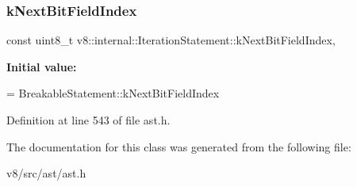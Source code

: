 \subsubsection{\texorpdfstring{k\+Next\+Bit\+Field\+Index}{kNextBitFieldIndex}}
{\footnotesize\ttfamily const uint8\+\_\+t v8\+::internal\+::\+Iteration\+Statement\+::k\+Next\+Bit\+Field\+Index\hspace{0.3cm}{\ttfamily [static]}, {\ttfamily [protected]}}

{\bfseries Initial value\+:}
\begin{DoxyCode}
=
      BreakableStatement::kNextBitFieldIndex
\end{DoxyCode}


Definition at line 543 of file ast.\+h.



The documentation for this class was generated from the following file\+:\begin{DoxyCompactItemize}
\item 
v8/src/ast/ast.\+h\end{DoxyCompactItemize}
